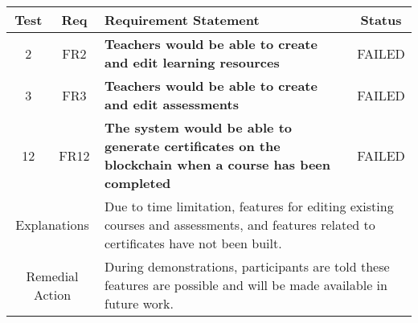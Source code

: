 \begin{table}[!ht]
	\begin{tabularx}{\textwidth}{|c|c|X|c|}
		\hline
		Test                                  & Req                                                                                                                                          & Requirement Statement                                                 & Status                 \\
		\hline
		2                                     & FR2                                                                                                                                          & \textbf{Teachers would be able to create and edit learning resources} & \cellcolor{pink}FAILED \\
		\hline
		3                                     & FR3                                                                                                                                          & \textbf{Teachers would be able to create and edit assessments}        & \cellcolor{pink}FAILED \\
		\hline
		12                                                                & FR12                    & \textbf{The system would be able to generate certificates on
		the blockchain when a course has been completed}                  & \cellcolor{pink}FAILED                                                                                                                                                                                    \\
		\hline
		\multicolumn{2}{|c|}{Explanations}     & \multicolumn{2}{X|}{Due to time limitation, features for editing existing courses and assessments, and features related to certificates have not been built.}                                                                                                                        \\
		\hline
		\multicolumn{2}{|c|}{Remedial Action} & \multicolumn{2}{X|}{During demonstrations, participants are told these features are possible and will be made available in future work.}                                                                                                  \\
		\hline
	\end{tabularx}
\end{table}
\clearpage
